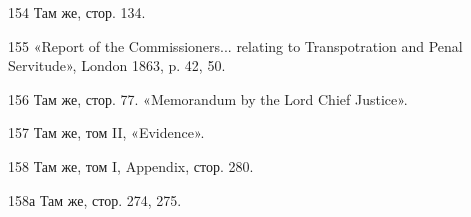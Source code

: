 154 Там же, стор. 134.

155 «Report of the Commissioners... relating to Transpotration and
Penal Servitude», London 1863, p. 42, 50.

156 Там же, стор. 77. «Memorandum by the Lord Chief Justice».

157 Там же, том II, «Evidence».

158 Там же, том I, Appendix, стор. 280.

158а Там же, стор. 274, 275.
